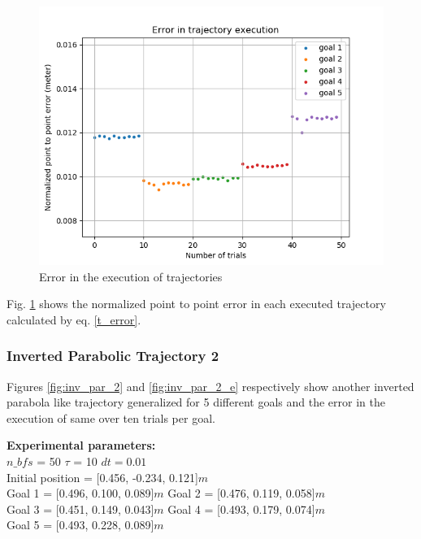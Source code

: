 \begin{figure}[H]
	\centering
	\includegraphics[scale=0.65]{images/1/inv_par_1_e.png}
	\caption{Error in the execution of trajectories}
	\label{fig:inv_par_1_e}
\end{figure}

Fig. \ref{fig:inv_par_1_e} shows the normalized point to point error in each executed trajectory calculated by eq. \ref{t_error}. 

\subsubsection{Inverted Parabolic Trajectory 2}

Figures \ref{fig:inv_par_2} and \ref{fig:inv_par_2_e} respectively show another inverted parabola like trajectory generalized for 5 different goals and the error in the execution of same over ten trials per goal. 

\textbf{Experimental parameters:} \\
$n\_bfs$ = 50 \hspace{3cm}
$\tau$ = 10 \hspace{3cm}
$dt = 0.01$\\
Initial position = [0.456, -0.234, 0.121]$m$ \\
Goal 1 = [0.496, 0.100, 0.089]$m$ \hspace{2cm}
Goal 2 = [0.476, 0.119, 0.058]$m$ \\
Goal 3 = [0.451, 0.149, 0.043]$m$ \hspace{2cm}
Goal 4 = [0.493, 0.179, 0.074]$m$ \\
Goal 5 = [0.493, 0.228, 0.089]$m$


